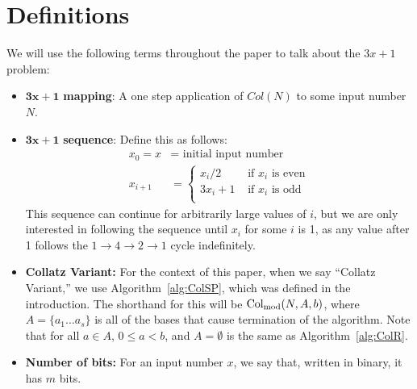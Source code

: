\chapter{Definitions} \label{sec:defns}
We will use the following terms throughout the paper to talk about the $3x+1$ problem:
\begin{itemize}
    \item $\boldsymbol{3x+1}$\textbf{ mapping}: A one step application of $Col(N)$ to some input number $N$.
    \item $\boldsymbol{3x+1}$\textbf{ sequence}: Define this as follows: 
    \begin{align*}
        x_0 = x &= \text{ initial input number} \\
        x_{i+1} &= \begin{cases} 
        x_{i}/2 &\text{ if $x_i$ is even} \\
        3 x_{i} + 1 &\text{ if $x_i$ is odd} \\
        \end{cases}
    \end{align*}
    This sequence can continue for arbitrarily large values of $i$, but we are only interested in following the sequence until $x_i$ for some $i$ is 1, as any value after 1 follows the $1 \rightarrow 4 \rightarrow 2 \rightarrow 1$ cycle indefinitely.
    \item \textbf{Collatz Variant:} For the context of this paper, when we say ``Collatz Variant,'' we use Algorithm~\ref{alg:ColSP}, which was defined in the introduction. The shorthand for this will be $\mathrm{Col}_{\text{mod}}(N,A,b)$, where $A = \{a_1 \ldots a_s\}$ is all of the bases that cause termination of the algorithm. Note that for all $a \in A$, $0 \le a < b$, and $A = \emptyset$ is the same as Algorithm~\ref{alg:ColR}.
    \item \textbf{Number of bits:} For an input number $x$, we say that, written in binary, it has $m$ bits.
\end{itemize}
